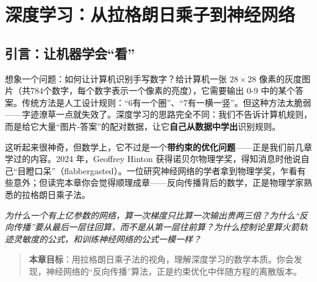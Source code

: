 \chapter{深度学习：从拉格朗日乘子到神经网络}

\section*{引言：让机器学会“看”}


想象一个问题：如何让计算机识别手写数字？给计算机一张 $28 \times 28$ 像素的灰度图片（共784个数字，每个数字表示一个像素的亮度），它需要输出 0-9 中的某个答案。传统方法是人工设计规则：``6有一个圈''、``7有一横一竖''。但这种方法太脆弱——字迹潦草一点就失效了。深度学习的思路完全不同：我们不告诉计算机规则，而是给它大量``图片-答案''的配对数据，让它\textbf{自己从数据中学出}识别规则。

这听起来很神奇，但数学上，它不过是一个\textbf{带约束的优化问题}——正是我们前几章学过的内容。2024 年，Geoffrey Hinton 获得诺贝尔物理学奖，得知消息时他说自己``目瞪口呆''（flabbergasted）。一位研究神经网络的学者拿到物理学奖，乍看有些意外；但读完本章你会觉得顺理成章——反向传播背后的数学，正是物理学家熟悉的拉格朗日乘子法。

\vspace{0.3cm}
\noindent\textit{为什么一个有上亿参数的网络，算一次梯度只比算一次输出贵两三倍？为什么“反向传播”要从最后一层往回算，而不是从第一层往前算？为什么控制论里算火箭轨迹灵敏度的公式，和训练神经网络的公式一模一样？}

\begin{quote}
\textbf{本章目标}：用拉格朗日乘子法的视角，理解深度学习的数学本质。你会发现，神经网络的``反向传播''算法，正是约束优化中伴随方程的离散版本。
\end{quote}

